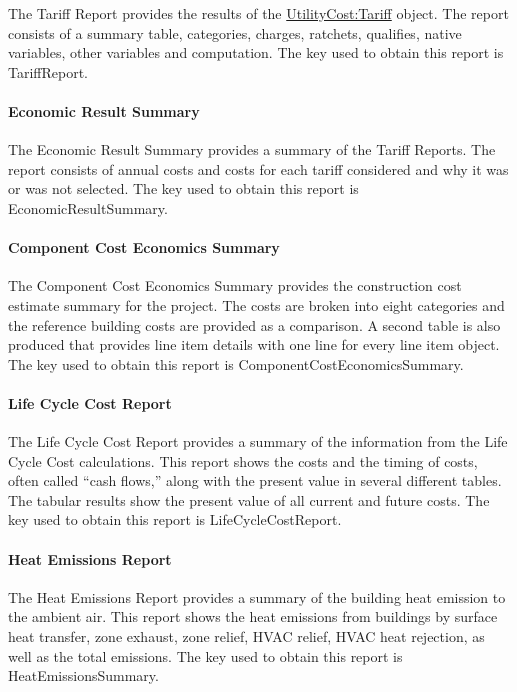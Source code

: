 The Tariff Report provides the results of the \hyperref[utilitycosttariff]{UtilityCost:Tariff} object. The report consists of a summary table, categories, charges, ratchets, qualifies, native variables, other variables and computation. The key used to obtain this report is TariffReport.

\paragraph{Economic Result Summary}\label{EconomicResultSummary}

The Economic Result Summary provides a summary of the Tariff Reports. The report consists of annual costs and costs for each tariff considered and why it was or was not selected. The key used to obtain this report is EconomicResultSummary.

\paragraph{Component Cost Economics Summary}\label{component-cost-economics-summary}

The Component Cost Economics Summary provides the construction cost estimate summary for the project. The costs are broken into eight categories and the reference building costs are provided as a comparison. A second table is also produced that provides line item details with one line for every line item object. The key used to obtain this report is ComponentCostEconomicsSummary.

\paragraph{Life Cycle Cost Report}\label{LifeCycleCostReport}

The Life Cycle Cost Report provides a summary of the information from the Life Cycle Cost calculations.  This report shows the costs and the timing of costs, often called “cash flows,” along with the present value in several different tables. The tabular results show the present value of all current and future costs. The key used to obtain this report is LifeCycleCostReport.

\paragraph{Heat Emissions Report}\label{HeatEmissionsReport}

The Heat Emissions Report provides a summary of the building heat emission to the ambient air. This report shows the heat emissions from buildings by surface heat transfer, zone exhaust, zone relief, HVAC relief, HVAC heat rejection, as well as the total emissions. The key used to obtain this report is HeatEmissionsSummary.

